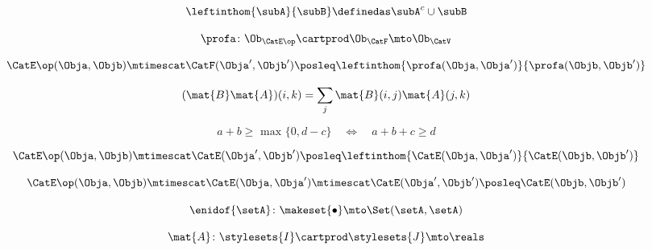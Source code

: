 \begin{forslides}
     \begin{equation}
        \label{eq:slides_enrichment_65}
       \leftinthom{\subA}{\subB} \definedas \subA^{c} \cup \subB
    \end{equation}
    
     \begin{equation}
        \label{eq:slides_enrichment_66}
       \profa \colon \Ob_{\CatE\op} \cartprod \Ob_{\CatF} \mto \Ob_\CatV
    \end{equation}
    
    \begin{equation}
        \label{eq:slides_enrichment_67}
       \CatE\op(\Obja, \Objb) \mtimescat \CatF(\Obja', \Objb') \posleq \leftinthom{\profa(\Obja, \Obja')}{\profa(\Objb, \Objb')}
    \end{equation}
    
     \begin{equation}
        \label{eq:slides_enrichment_68}
       (\mat{B} \mat{A})(i, k) = \sum_{j} \mat{B}(i,j) \mat{A}(j,k) 
    \end{equation}
    
     \begin{equation}
        \label{eq:slides_enrichment_69}
       a + b \geq \text{ max } \{ 0, d - c \} \quad \Leftrightarrow \quad a + b + c \geq d 
    \end{equation}
    
     \begin{equation}
        \label{eq:slides_enrichment_70}
       \CatE\op(\Obja, \Objb) \mtimescat \CatE(\Obja', \Objb') \posleq \leftinthom{\CatE(\Obja, \Obja')}{\CatE(\Objb, \Objb')}
    \end{equation}
    
    \begin{equation}
        \label{eq:slides_enrichment_71}
       \CatE\op(\Obja, \Objb) \mtimescat \CatE(\Obja, \Obja') \mtimescat \CatE(\Obja', \Objb') \posleq \CatE(\Objb, \Objb')
    \end{equation}
    
    \begin{equation}
        \label{eq:slides_enrichment_72}
      \enidof{\setA} \colon \makeset{ \bullet } \mto \Set(\setA, \setA)
    \end{equation}
    
    \begin{equation}
        \label{eq:slides_enrichment_73}
      \mat{A} \colon \stylesets{I} \cartprod \stylesets{J} \mto \reals 
    \end{equation}
    

\end{forslides}
